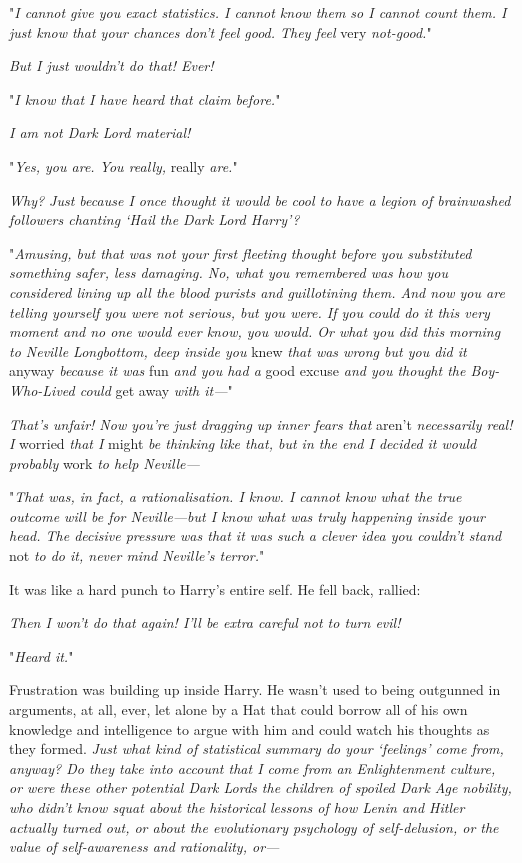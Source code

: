 "\emph{I cannot give you exact statistics. I cannot know them so I cannot count
them. I just know that your chances don't feel good. They feel} very \emph{
not-good.}"

\emph{But I just wouldn't do that! Ever!}

"\emph{I know that I have heard that claim before.}"

\emph{I am not Dark Lord material!}

"\emph{Yes, you are. You really,} really \emph{are.}"

\emph{Why? Just because I once thought it would be cool to have a legion of
brainwashed followers chanting `Hail the Dark Lord Harry'?}

"\emph{Amusing, but that was not your first fleeting thought before you
substituted something safer, less damaging. No, what you remembered was how you
considered lining up all the blood purists and guillotining them. And now you
are telling yourself you were not serious, but you were. If you could do it
this very moment and no one would ever know, you would. Or what you did this
morning to Neville Longbottom, deep inside you} knew \emph{that was wrong but
you did it} anyway \emph{because it was} fun \emph{and you had a} good
excuse \emph{and you thought the Boy-Who-Lived could} get away \emph{with
it---}"

\emph{That's unfair! Now you're just dragging up inner fears that} aren't \emph{
necessarily real! I} worried \emph{that I} might \emph{be thinking like that,
but in the end I decided it would probably} work \emph{to help Neville---}

"\emph{That was, in fact, a rationalisation. I know. I cannot know what the
true outcome will be for Neville---but I know what was truly happening inside
your head. The decisive pressure was that it was such a clever idea you
couldn't stand} not \emph{to do it, never mind Neville's terror.}"

It was like a hard punch to Harry's entire self. He fell back, rallied:

\emph{Then I won't do that again! I'll be extra careful not to turn evil!}

"\emph{Heard it.}"

Frustration was building up inside Harry. He wasn't used to being outgunned in
arguments, at all, ever, let alone by a Hat that could borrow all of his own
knowledge and intelligence to argue with him and could watch his thoughts as
they formed. \emph{Just what kind of statistical summary do your `feelings'
come from, anyway? Do they take into account that I come from an Enlightenment
culture, or were these other potential Dark Lords the children of spoiled Dark
Age nobility, who didn't know squat about the historical lessons of how Lenin
and Hitler actually turned out, or about the evolutionary psychology of
self-delusion, or the value of self-awareness and rationality, or---}

